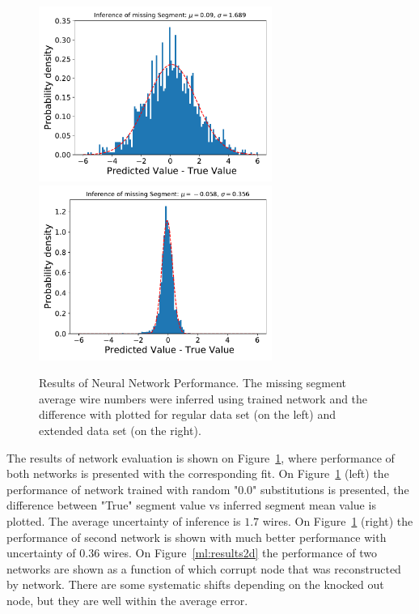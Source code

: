 \documentclass[12pt]{article}
\begin{document}
\begin{figure}[!ht]
\begin{center}
 \includegraphics[width=3.0in]{images/figure_r.pdf}
 \includegraphics[width=3.0in]{images/figure_n.pdf}
\caption {Results of Neural Network Performance. The missing segment average wire numbers were inferred using trained network and the difference with plotted for regular data set (on the left) and extended data set (on the right). }
 \label{ml:results}
 \end{center}
\end{figure}

The results of network evaluation is shown on Figure~\ref{ml:results}, where performance of both networks is presented with the corresponding fit. On Figure~\ref{ml:results} (left) the performance of network trained with random "0.0" substitutions is presented, the difference between "True" segment value vs inferred segment mean value is plotted. The average uncertainty of inference is $1.7$ wires. On Figure~\ref{ml:results} (right) the performance of second network is shown with much better performance with uncertainty of $0.36$ wires. On Figure~\ref{ml:results2d}  the performance of two networks are shown as a function of which corrupt node that was reconstructed by network. There are some systematic shifts depending on the knocked out node, but they are well within the average error.
\end{document}
